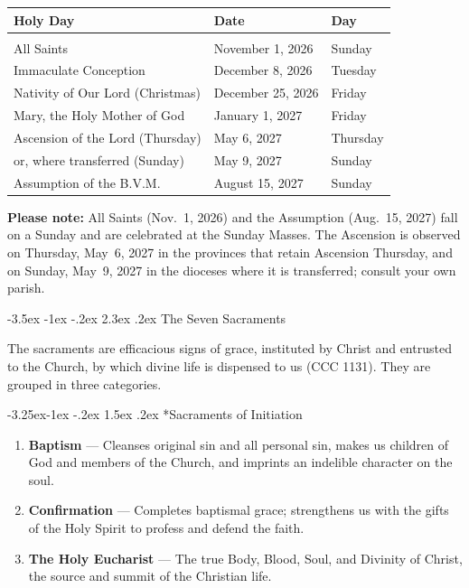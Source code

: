 \documentclass[11pt]{article}
\makeatletter
\renewcommand\section{\@startsection{section}{1}{\z@}%
  {-3.5ex \@plus -1ex \@minus -.2ex}%
  {2.3ex \@plus.2ex}%
  {\normalfont\Large\bfseries\color{churchblue}}}
\renewcommand\subsection{\@startsection{subsection}{2}{\z@}%
  {-3.25ex\@plus -1ex \@minus -.2ex}%
  {1.5ex \@plus .2ex}%
  {\normalfont\large\bfseries\color{churchgold}}}
\makeatother
\begin{document}
\begin{center}
\begin{tabular}{lll}
\textbf{Holy Day} & \textbf{Date} & \textbf{Day} \\[2pt]
\hline\\[-8pt]
All Saints & November 1, 2026 & Sunday \\
Immaculate Conception & December 8, 2026 & Tuesday \\
Nativity of Our Lord (Christmas) & December 25, 2026 & Friday \\
Mary, the Holy Mother of God & January 1, 2027 & Friday \\
Ascension of the Lord (Thursday) & May 6, 2027 & Thursday \\
\quad or, where transferred (Sunday) & May 9, 2027 & Sunday \\
Assumption of the B.V.M. & August 15, 2027 & Sunday \\
\end{tabular}
\end{center}

\textbf{Please note:} All Saints (Nov.~1, 2026) and the Assumption
(Aug.~15, 2027) fall on a Sunday and are celebrated at the Sunday Masses.
The Ascension is observed on Thursday, May~6, 2027 in the provinces that
retain Ascension Thursday, and on Sunday, May~9, 2027 in the dioceses
where it is transferred; consult your own parish.

\newpage
\section{The Seven Sacraments}

The sacraments are efficacious signs of grace, instituted by Christ and
entrusted to the Church, by which divine life is dispensed to us
(CCC 1131). They are grouped in three categories.

\subsection*{Sacraments of Initiation}
\begin{enumerate}
  \item \textbf{Baptism} --- Cleanses original sin and all personal sin, makes us children of God and members of the Church, and imprints an indelible character on the soul.
  \item \textbf{Confirmation} --- Completes baptismal grace; strengthens us with the gifts of the Holy Spirit to profess and defend the faith.
  \item \textbf{The Holy Eucharist} --- The true Body, Blood, Soul, and Divinity of Christ, the source and summit of the Christian life.
\end{enumerate}
\end{document}
